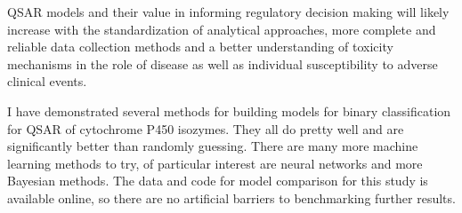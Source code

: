 

QSAR models and their value in informing regulatory decision making will likely increase with the standardization of analytical approaches, more complete and reliable data collection methods and a better understanding of toxicity mechanisms in the role of disease as well as individual susceptibility to adverse clinical events. \cite{Kruhlak2012}

I have demonstrated several methods for building models for binary classification for QSAR of cytochrome P450 isozymes. They all do pretty well and are significantly better than randomly guessing.
There are many more machine learning methods to try, of particular interest are neural networks and more Bayesian methods. The data and code for model comparison for this study is available online, so there are no artificial barriers to benchmarking further results.


